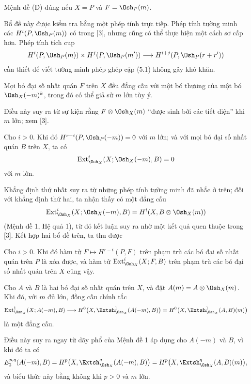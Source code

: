  Mệnh đề (D) đúng nếu $X=P$ và $F=\Osh_P(m)$.

Bổ đề này được kiểm tra bằng một phép tính trực tiếp. Phép tính tường minh các
$H^{i}(P,\Osh_P(m))$ có trong [3], nhưng cũng có thể thực hiện một cách sơ cấp
hơn. Phép tính tích cup
\[
  H^{i}(P,\Osh_P(m))\times H^{j}(P,\Osh_P(m'))
  \longrightarrow H^{i+j}(P,\Osh_P(r+r'))
\]
cần thiết để viết tường minh phép ghép cặp (5.1) không gây khó khăn.

 Mọi bó đại số nhất quán $F$ trên $X$ đều đẳng cấu với một
bó thương của một bó $\Osh_X(-m)^{k}$, trong đó có thể giả sử $m$ lớn tùy ý.

Điều này suy ra từ sự kiện rằng $F\otimes\Osh_X(m)$ ``được sinh bởi các tiết
diện'' khi $m$ lớn; xem [3].

 Cho $i>0$. Khi đó
$H^{r-i}(P,\Osh_P(-m))=0$ với $m$ lớn; và với mọi bó đại số nhất quán $B$
trên $X$, ta có
\[
  \operatorname{Ext}_{\Osh_X}^{i}(X;\Osh_X(-m),B)=0
\]
với $m$ lớn.

Khẳng định thứ nhất suy ra từ những phép tính tường minh đã nhắc ở trên; đối
với khẳng định thứ hai, ta nhận thấy có một đẳng cấu
\[
  \operatorname{Ext}_{\Osh_X}^{i}(X;\Osh_X(-m),B)
  =H^{i}(X,B\otimes\Osh_X(m))
\]
(Mệnh đề 1, Hệ quả 1), từ đó kết luận suy ra nhờ một kết quả quen thuộc trong
[3]. Kết hợp hai bổ đề trên, ta thu được

 Cho $i>0$. Khi đó hàm tử
$F\longmapsto H^{r-i}(P,F)$ trên phạm trù các bó đại số nhất quán trên $P$
là xóa được, và hàm tử
$\operatorname{Ext}_{\Osh_X}^{i}(X;F,B)$ trên phạm trù các bó đại số nhất quán
trên $X$ cũng vậy.


 Cho $A$ và $B$ là hai bó đại số nhất quán trên
$X$, và đặt $A(m)=A\otimes\Osh_X(m)$. Khi đó, với $m$ đủ lớn,
đồng cấu chính tắc
\[
  \operatorname{Ext}_{\Osh_X}^{1}(X;A(-m),B)
  \longrightarrow H^{0}\bigl(X,\Extsh_{\Osh_X}^{1}(A(-m),B)\bigr)
  =H^{0}\bigl(X,\Extsh_{\Osh_X}^{1}(A,B)(m)\bigr)
\]
là một đẳng cấu.

Điều này suy ra ngay từ dãy phổ của Mệnh đề 1 áp dụng cho
$A(-m)$ và $B$, vì khi đó ta có
\[
  E_{2}^{p,q}(A(-m),B)
  =H^{p}\bigl(X,\Extsh_{\Osh_X}^{q}(A(-m),B)\bigr)
  =H^{p}\bigl(X,\Extsh_{\Osh_X}^{q}(A,B)(m)\bigr),
\]
và biểu thức này bằng không khi $p>0$ và $m$ lớn.

